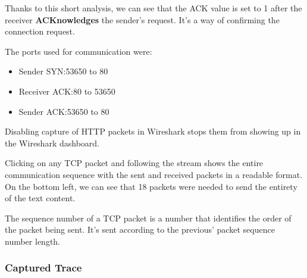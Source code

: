 Thanks to this short analysis, we can see that the ACK value is set to 1 after
the receiver \textbf{ACKnowledges} the sender's request. It's a way of
confirming the connection request.

The ports used for communication were:

\begin{itemize}
    \item Sender SYN:\@ 53650 to 80
    \item Receiver ACK:\@ 80 to 53650
    \item Sender ACK:\@ 53650 to 80
\end{itemize}

Disabling capture of HTTP packets in Wireshark stops them from showing up in
the Wireshark dashboard.

Clicking on any TCP packet and following the stream shows the entire
communication sequence with the sent and received packets in a readable format.
On the bottom left, we can see that 18 packets were needed to send the entirety
of the text content.

The sequence number of a TCP packet is a number that identifies the order of
the packet being sent. It's sent according to the previous' packet sequence
number length.

\subsubsection{Captured Trace}
